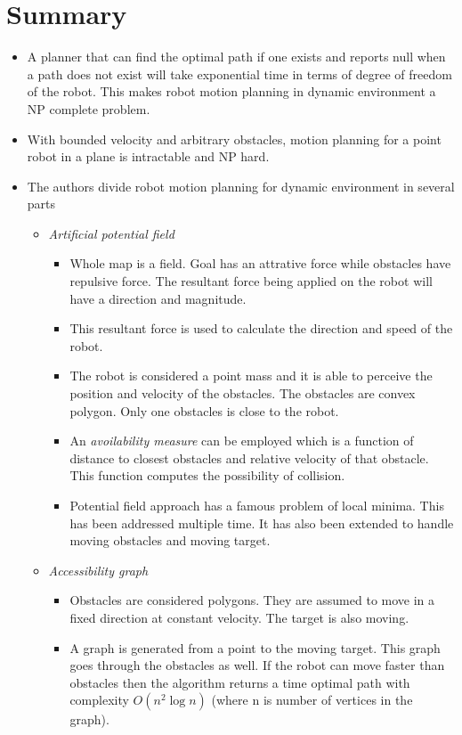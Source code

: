 \documentclass[12pt]{article}
\begin{document}
\section{Summary}
\begin{itemize}
    \item A planner that can find the optimal path if one exists and reports null when a path does not exist will take exponential time in terms of degree of freedom of the robot. This makes robot motion planning in dynamic environment a NP complete problem.
    \item With bounded velocity and arbitrary obstacles, motion planning for a point robot in a plane  is intractable and NP hard.
    \item The authors divide robot motion planning for dynamic environment in several parts
    \begin{itemize}
        \item \textit{Artificial potential field}
        \begin{itemize}
            \item Whole map is a field. Goal has an attrative force while obstacles have repulsive force. The resultant force being applied on the robot will have a direction and magnitude.
            \item This resultant force is used to calculate the direction and speed of the robot.
            \item The robot is considered a point mass and it is able to perceive the position and velocity of the obstacles. The obstacles are convex polygon. Only one obstacles is close to the robot.
            \item An \textit{avoilability measure} can be employed which is a function of distance to closest obstacles and relative velocity of that obstacle. This function computes the possibility of collision.
            \item Potential field approach has a famous problem of local minima. This has been addressed multiple time. It has also been extended to handle moving obstacles and moving target.
        \end{itemize}
        \item \textit{Accessibility graph}
        \begin{itemize}
            \item Obstacles are considered polygons. They are assumed to move in a fixed direction at constant velocity. The target is also moving.
            \item A graph is generated from a point to the moving target. This graph goes through the obstacles as well. If the robot can move faster than obstacles then the algorithm returns a time optimal path with complexity $O(n^2 \log n)$ (where n is number of vertices in the graph).

\end{itemize}
\end{itemize}
\end{itemize}
\end{document}
